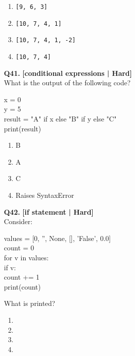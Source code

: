 \begin{enumerate}[label=(\alph*),topsep=2pt,itemsep=1pt,partopsep=0pt,parsep=0pt]
    \item \relax \texttt{[9, 6, 3]}
    \item \relax \texttt{[10, 7, 4, 1]}
    \item \relax \texttt{[10, 7, 4, 1, -2]}
    \item \relax \texttt{[10, 7, 4]}
\end{enumerate}
\vspace{2mm}

\noindent\textbf{Q41.} \hfill {\small\color{LPUOrange}\textbf{[conditional expressions | Hard]}}\\[2pt]
What is the output of the following code? 

\begin{pycode}
x = 0\\
y = 5\\
result = "A" if x else "B" if y else "C"\\
print(result)
\end{pycode}

\begin{enumerate}[label=(\alph*),topsep=2pt,itemsep=1pt,partopsep=0pt,parsep=0pt]
    \item \relax B
    \item \relax A
    \item \relax C
    \item \relax Raises SyntaxError
\end{enumerate}
\vspace{2mm}

\noindent\textbf{Q42.} \hfill {\small\color{LPUOrange}\textbf{[if statement | Hard]}}\\[2pt]
Consider: 

\begin{pycode}
values = [0, '', None, [], 'False', 0.0]\\
count = 0\\
for v in values:\\
if v:\\
count += 1\\
print(count)
\end{pycode}

 What is printed?

\begin{enumerate}[label=(\alph*),topsep=2pt,itemsep=1pt,partopsep=0pt,parsep=0pt]
    \item {}
    \item {}
    \item {}
    \item {}
\end{enumerate}
\vspace{2mm}

